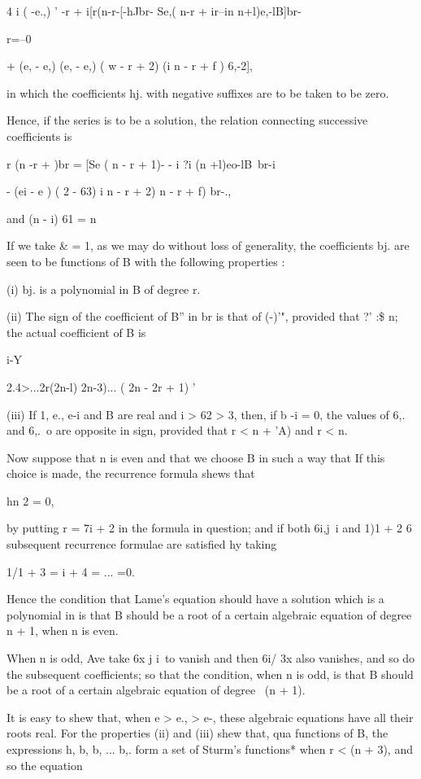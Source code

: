 {{{{4 i ( -e.,) ' -r + i[r(n-r-[-hJbr- Se,( n-r + ir--in n+l)e,-lB]br-

r=--0

+ (e, - e,) (e, - e,) ( w - r + 2) (i n - r + f ) 6,-2],

in which the coefficients hj. with negative suffixes are to be taken
to be zero.

Hence, if the series is to be a solution, the relation connecting
successive coefficients is

r (n -r + )br = [Se ( n - r + 1)- - i ?i (n +l)eo-lB\ br-i

- (ei - e ) ( 2 - 63) i n - r + 2) n - r + f) br-.,

and (n - i) 61 = n%

If we take \& = 1, as we may do without loss of generality, the
coefficients bj. are seen to be functions of B with the following
properties :

(i) bj. is a polynomial in B of degree r.

(ii) The sign of the coefficient of B'' in br is that of (-)'",
provided that ?' :\$ n; the actual coefficient of B is

i-Y

2.4>...2r(2n-l) 2n-3)... ( 2n - 2r + 1) '

(iii) If 1, e., e-i and B are real and i > 62 > 3, then, if b -i = 0,
the values of 6,. and 6,.\ o are opposite in sign, provided that r < n
+ 'A) and r < n.

Now suppose that n is even and that we choose B in such a way that If
this choice is made, the recurrence formula shews that

hn 2 = 0,

%
%

by putting r = 7i + 2 in the formula in question; and if both 6i,j\ i
and 1)1 + 2 6 subsequent recurrence formulae are satisfied hy taking

 1/1 + 3 = i + 4 = ... =0.

Hence the condition that Lame's equation should have a solution which
is a polynomial in is that B should be a root of a certain algebraic
equation of degree n + 1, when n is even.

When n is odd, Ave take 6x j i\ to vanish and then 6i/ 3x also
vanishes, and so do the subsequent coefficients; so that the
condition, when n is odd, is that B should be a root of a certain
algebraic equation of degree \ (n + 1).

It is easy to shew that, when e > e., > e-, these algebraic equations
have all their roots real. For the properties (ii) and (iii) shew
that, qua functions of B, the expressions h, b, b, ... b,. form a
set of Sturm's functions* when r < (n + 3), and so the equation

}}}}
